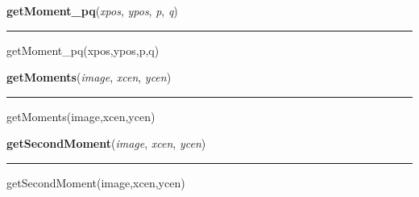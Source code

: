     \label{multireg:findedges:getMoment_pq}
    \vspace{0.5ex}

    \begin{boxedminipage}{\textwidth}

    \raggedright \textbf{getMoment\_pq}(\textit{xpos}, \textit{ypos}, \textit{p}, \textit{q})

    \vspace{-1.5ex}

    \rule{\textwidth}{0.5\fboxrule}
    getMoment\_pq(xpos,ypos,p,q)

    \vspace{1ex}

    \end{boxedminipage}

    \label{multireg:findedges:getMoments}
    \vspace{0.5ex}

    \begin{boxedminipage}{\textwidth}

    \raggedright \textbf{getMoments}(\textit{image}, \textit{xcen}, \textit{ycen})

    \vspace{-1.5ex}

    \rule{\textwidth}{0.5\fboxrule}
    getMoments(image,xcen,ycen)

    \vspace{1ex}

    \end{boxedminipage}

    \label{multireg:findedges:getSecondMoment}
    \vspace{0.5ex}

    \begin{boxedminipage}{\textwidth}

    \raggedright \textbf{getSecondMoment}(\textit{image}, \textit{xcen}, \textit{ycen})

    \vspace{-1.5ex}

    \rule{\textwidth}{0.5\fboxrule}
    getSecondMoment(image,xcen,ycen)

    \vspace{1ex}

    \end{boxedminipage}

